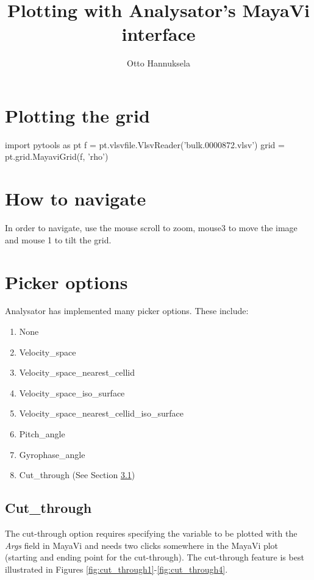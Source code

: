 \documentclass[a4paper,10pt]{article}
\title{Plotting with Analysator's MayaVi interface}
\author{Otto Hannuksela}
\begin{document}
\maketitle

\tableofcontents

\newpage

\section{Plotting the grid}

\begin{python}
import pytools as pt
f = pt.vlsvfile.VlsvReader('bulk.0000872.vlsv')
grid = pt.grid.MayaviGrid(f, 'rho')
\end{python}

\section{How to navigate}

In order to navigate, use the mouse scroll to zoom, mouse3 to move the image and mouse 1 to tilt the 
grid.

\section{Picker options}

Analysator has implemented many picker options. These include:

\begin{enumerate}
 \item None
 \item Velocity\_space
 \item Velocity\_space\_nearest\_cellid
 \item Velocity\_space\_iso\_surface
 \item Velocity\_space\_nearest\_cellid\_iso\_surface
 \item Pitch\_angle
 \item Gyrophase\_angle
 \item Cut\_through (See Section \ref{ssec:cutthrough})
\end{enumerate}

\newpage

\subsection{Cut\_through} \label{ssec:cutthrough}

The cut-through option requires specifying the variable to be plotted with the \emph{Args} field in 
MayaVi and needs two clicks somewhere in the MayaVi plot (starting and ending point for the cut-through). 
The cut-through feature is best illustrated in Figures \ref{fig:cut_through1}-\ref{fig:cut_through4}.
\end{document}
